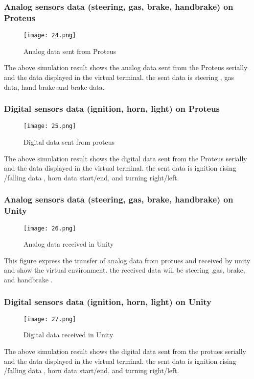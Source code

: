 \documentclass[12pt,a4paper]{article}
\begin{document}
\begin{center}
\begin{center}
\begin{center}
\begin{itemize}
\subsubsection{Analog sensors data (steering, gas, brake, handbrake) on Proteus}
\begin{figure}[H]
	\centering 
	\texttt{[image: 24.png]}
	\caption{Analog data sent from Proteus}	
\end{figure}
The above simulation result shows the analog data sent from the Proteus serially and the data displayed in the virtual terminal. the sent data  is steering , gas data, hand brake and brake data.
\subsubsection{Digital sensors data (ignition, horn, light) on Proteus}
\begin{figure}[H]
	\centering 
	\texttt{[image: 25.png]}
	\caption{Digital data sent from proteus}	
\end{figure}
The above simulation result shows the digital data sent from the Proteus serially and the data displayed in the virtual terminal. the sent data  is ignition rising /falling data , horn data start/end,  and turning right/left.
\subsubsection{Analog sensors data (steering, gas, brake, handbrake) on Unity}
\begin{figure}[H]
	\centering 
	\texttt{[image: 26.png]}
	\caption{Analog data received in Unity}	
\end{figure}
This figure express the transfer of analog data from protues and received by unity and show the virtual environment. the received data will be steering ,gas, brake, and handbrake .
\subsubsection{Digital sensors data (ignition, horn, light) on Unity}
\begin{figure}[H]
	\centering 
	\texttt{[image: 27.png]}
	\caption{Digital data received in Unity}	
\end{figure}
The above simulation result shows the digital data sent from the protues serially and the data displayed in the virtual terminal. the sent data  is ignition rising /falling data , horn data start/end,  and turning right/left.


\end{itemize}
\end{center}
\end{center}
\end{center}
\end{document}
